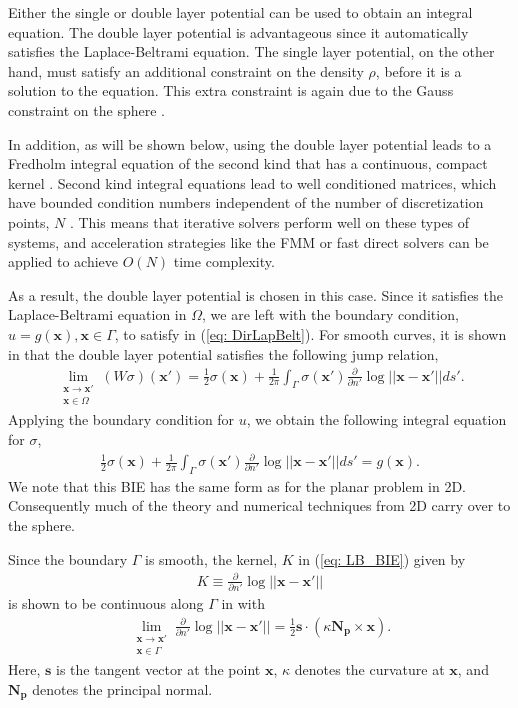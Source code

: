 \documentclass{sfuthesis}
\begin{document}
Either the single or double layer potential can be used to obtain an integral equation. The double layer potential is advantageous since it automatically satisfies the Laplace-Beltrami equation. The single layer potential, on the other hand, must satisfy an additional constraint on the density $\rho$, before it is a solution to the equation. This extra constraint is again due to the Gauss constraint on the sphere \cite{GemmNigStein2008}.  

In addition, as will be shown below, using the double layer potential leads to a Fredholm integral equation of the second kind that has a continuous, compact kernel \cite{KropNig2014}. Second kind integral equations lead to well conditioned matrices, which have bounded condition numbers independent of the number of discretization points, $N$ \cite{Atk97}. This means that iterative solvers perform well on these types of systems, and acceleration strategies like the FMM or fast direct solvers can be applied to achieve $O(N)$ time complexity. 

As a result, the double layer potential is chosen in this case. Since it satisfies the Laplace-Beltrami equation in $\Omega$, we are left with the boundary condition, $u=g(\mathbf{x}), \mathbf{x}\in \Gamma$, to satisfy in (\ref{eq: DirLapBelt}). For smooth curves, it is shown in \cite{GemmNigStein2008} that the double layer potential satisfies the following jump relation, 
\begin{align}
	\displaystyle \lim_{\substack{\mathbf{x}\to\mathbf{x'}\\ \mathbf{x}\in\Omega}}  (W\sigma)(\mathbf{x'})=\frac{1}{2}\sigma(\mathbf{x})+\frac{1}{2\pi}\int_{\Gamma}\sigma(\mathbf{x'})		\frac{\partial}{\partial n'}\log ||\mathbf{x}-\mathbf{x'}||ds'. \label{eq: JumpCondition} 
\end{align}
Applying the boundary condition for $u$, we obtain the following integral equation for $\sigma$, 
\begin{align}
	\frac{1}{2}\sigma(\mathbf{x})+\frac{1}{2\pi}\int_{\Gamma}\sigma(\mathbf{x'})\frac{\partial}{\partial n'}\log ||\mathbf{x}-\mathbf{x'}||ds'=g(\mathbf{x}). \label{eq: LB_BIE} 
\end{align}
We note that this BIE has the same form as for the planar problem in 2D. Consequently much of the theory and numerical techniques from 2D carry over to the sphere.

Since the boundary $\Gamma$ is smooth, the kernel, $K$ in (\ref{eq: LB_BIE}) given by 
\begin{align*}
	K\equiv \frac{\partial}{\partial n'} \log {||\mathbf{x}-\mathbf{x}'||} 
\end{align*}
is shown to be continuous along $\Gamma$ in \cite{KropNig2014} with 
\begin{align*}
	\lim_{\substack{\mathbf{x}\to\mathbf{x'}\\ \mathbf{x}\in\Gamma}} \frac{\partial}{\partial n'}\log||\mathbf{x}-\mathbf{x'}||=\frac{1}{2}\mathbf{s}\cdot(\kappa\mathbf{N_p}\times \mathbf{x}).
\end{align*}
Here, $\mathbf{s}$ is the tangent vector at the point $\mathbf{x}$, $\kappa$ denotes the curvature at $\mathbf{x}$, and $\mathbf{N_p}$ denotes the principal normal.  
\end{document}
